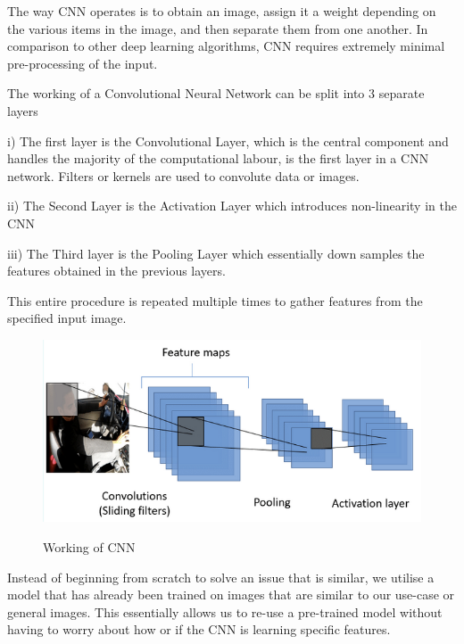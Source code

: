 \documentclass[ 12pt,a4paper,twocolumn,fleqn]{article}
\begin{document}
\begin{adjustwidth}{3.5em}{0pt}
The way CNN operates is to obtain an image, assign it a weight depending on the various items in the image, and then separate them from one another. In comparison to other deep learning algorithms, CNN requires extremely minimal pre-processing of the input.
\hspace{0.2cm}

The working of a Convolutional Neural Network can be split into 3 separate layers

i) The first layer is the Convolutional Layer, which is the central component and handles the majority of the computational labour, is the first layer in a CNN network.
Filters or kernels are used to convolute data or images.

ii) The Second Layer is the Activation Layer which introduces non-linearity in the CNN

iii) The Third layer is the Pooling Layer which essentially down samples the features obtained in the previous layers.

This entire procedure is repeated multiple times to gather features from the specified input image.

\begin{figure}[H]
\begin{center}
    \hspace*{0.4in}
    \includegraphics[scale=0.6]{media/conv.png}
    \\
  \caption{    Working of CNN}
\end{center}
\end{figure}

Instead of beginning from scratch to solve an issue that is similar, we utilise a model that has already been trained on images that are similar to our use-case or general images. This essentially allows us to re-use a pre-trained model without having to worry about how or if the CNN is learning specific features.


\end{adjustwidth}
\end{document}
